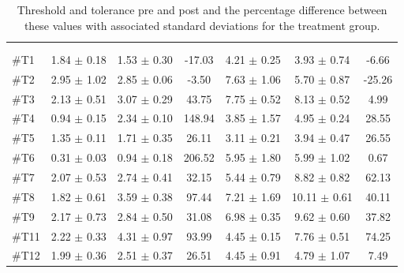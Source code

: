 \begin{longtable} {l|c|c|c|c|c|c}
	\caption{Threshold and tolerance pre and post and the percentage difference between these values with associated standard deviations for the treatment group.}
	\label{tab:Treatment} \\
\cellcolor[HTML]{C0C0C0} {} & 
\multicolumn{3}{c|}{ \cellcolor[HTML]{C0C0C0}{\textbf{Threshold}}} & \multicolumn{3}{c}{ \cellcolor[HTML]{C0C0C0}{\textbf{Tolerance}}}  	\\  \rule{0pt}{3ex} 
  \cellcolor[HTML]{C0C0C0}{} &
 \multicolumn{1}{c|}{ \cellcolor[HTML]{C0C0C0}{Pre [KgF]}} & \multicolumn{1}{c|}{ \cellcolor[HTML]{C0C0C0}{Post [KgF]}} &
 \multicolumn{1}{c|}{ \cellcolor[HTML]{C0C0C0}{Diff [\%]}} 
 & \multicolumn{1}{|c|}{ \cellcolor[HTML]{C0C0C0}{Pre [KgF]}} 
 & \multicolumn{1}{c|}{ \cellcolor[HTML]{C0C0C0}{Post [KgF]}} 
 & \multicolumn{1}{c|}{ \cellcolor[HTML]{C0C0C0}{Diff [\%]}} 
 	\\ \hline 
\#T1 & 1.84 $\pm$ 0.18 & 1.53 $\pm$ 0.30 & -17.03
& 4.21 $\pm$ 0.25 & 3.93 $\pm$ 0.74 & -6.66\\ \hline
\#T2 & 2.95 $\pm$ 1.02 & 2.85 $\pm$ 0.06 & -3.50 & 7.63 $\pm$ 1.06  & 5.70 $\pm$ 0.87 & -25.26\\ \hline
\#T3 & 2.13 $\pm$ 0.51 & 3.07 $\pm$ 0.29 & 43.75 & 7.75 $\pm$ 0.52 & 8.13 $\pm$ 0.52 & 4.99 \\ \hline
\#T4 & 0.94 $\pm$ 0.15 & 2.34 $\pm$ 0.10 & 148.94 & 3.85 $\pm$ 1.57 & 4.95 $\pm$ 0.24 & 28.55\\ \hline
\#T5 & 1.35 $\pm$ 0.11 & 1.71 $\pm$ 0.35 & 26.11 & 3.11 $\pm$ 0.21  & 3.94 $\pm$ 0.47 & 26.55 \\ \hline	
\#T6 & 0.31 $\pm$ 0.03 & 0.94 $\pm$ 0.18 & 206.52 & 5.95 $\pm$ 1.80 & 5.99 $\pm$  1.02 & 0.67\\ \hline
\#T7 & 2.07 $\pm$ 0.53 & 2.74 $\pm$ 0.41 & 32.15 & 5.44 $\pm$ 0.79 & 8.82 $\pm$ 0.82 & 62.13  \\ \hline
\#T8 & 1.82 $\pm$ 0.61 & 3.59 $\pm$ 0.38 & 97.44 & 7.21 $\pm$ 1.69 & 10.11 $\pm$ 0.61 & 40.11 \\ \hline
\#T9 & 2.17 $\pm$ 0.73 & 2.84 $\pm$ 0.50 & 31.08 & 6.98 $\pm$  0.35 & 9.62 $\pm$ 0.60 & 37.82 \\ \hline
\#T11 & 2.22 $\pm$ 0.33 & 4.31 $\pm$ 0.97 & 93.99 & 4.45 $\pm$ 0.15 & 7.76 $\pm$  0.51 & 74.25 \\ \hline
\#T12 & 1.99 $\pm$ 0.36 & 2.51 $\pm$ 0.37 & 26.51 & 4.45 $\pm$ 0.91  & 4.79 $\pm$ 1.07 & 7.49 \\ \hline

\end{longtable}
